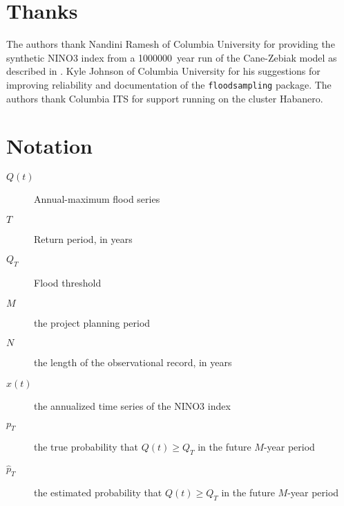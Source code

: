 \documentclass[12pt]{article}
\begin{document}
\appendix

\section{Thanks}

The authors thank Nandini Ramesh of Columbia University for providing the synthetic NINO3 index from a \SI{1000000}{year} run of the Cane-Zebiak model as described in \citet{Ramesh2017}.
Kyle Johnson of Columbia University for his suggestions for improving reliability and documentation of the \texttt{floodsampling} package.
The authors thank Columbia ITS for support running on the cluster Habanero.

\section{Notation}

\begin{description}
  \item[\( Q(t) \)] Annual-maximum flood series
  \item[\( T \)] Return period, in years
  \item[\( Q_T \)] Flood threshold
  \item[\( M \)] the project planning period
  \item[\( N \)] the length of the observational record, in years
  \item[\( x(t) \)] the annualized time series of the NINO3 index
  \item[\( p_T \)] the true probability that \( Q(t) \geq Q_T \) in the future \(M\)-year period
  \item[\( \hat{p}_T \)] the estimated probability that \( Q(t) \geq Q_T \) in the future \(M\)-year period
\end{description}

\printbibliography{}
\end{document}

